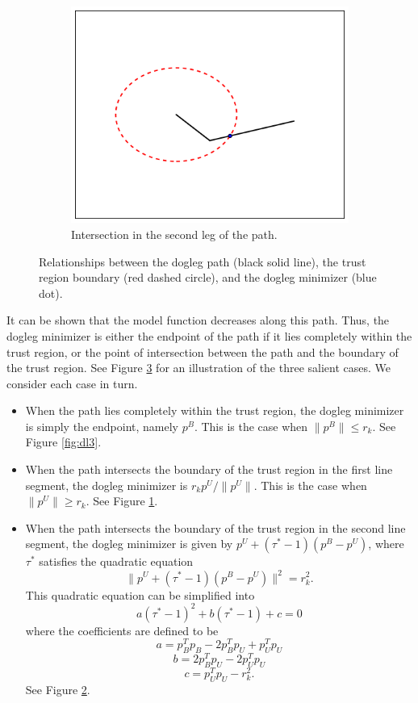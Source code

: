 \begin{figure}
\begin{subfigure}[b]{0.3\textwidth}
            \label{fig:dl1}
    \end{subfigure}
    ~ %
    \begin{subfigure}[b]{0.3\textwidth}
            \includegraphics[width=\textwidth]{dogleg2}
            \caption{Intersection in the second leg of the path.}
            \label{fig:dl2}
    \end{subfigure}
    \caption{Relationships between the dogleg path (black solid line),
    the trust region boundary (red dashed circle), and the dogleg minimizer (blue dot).}
    \label{fig:dogleg}
\end{figure}

It can be shown that the model function decreases along this path. Thus,
the dogleg minimizer is either the endpoint of the path if it lies completely within the trust region,
or the point of intersection between the path and the boundary of the trust region.
See Figure \ref{fig:dogleg} for an illustration of the three salient cases. We consider each case in turn.
\begin{itemize}
\item
When the path lies completely within the trust region, the dogleg minimizer is simply the endpoint, namely $p^B$.
This is the case when $\|p^B\| \leq r_k$. See Figure \ref{fig:dl3}.
\item
When the path intersects the boundary of the trust region in the first line segment, the dogleg minimizer is
$r_kp^U/\|p^U\|$.
This is the case when $\|p^U\| \geq r_k$. See Figure \ref{fig:dl1}.
\item
When the path intersects the boundary of the trust region in the second line segment, the dogleg minimizer is
given by $p^U + (\tau^*-1)(p^B-p^U)$, where $\tau^*$ satisfies the quadratic equation
\[
\|p^U + (\tau^*-1)(p^B-p^U)\|^2 = r_k^2.
\]
This quadratic equation can be simplified into 
\[
a(\tau^*-1)^2+b(\tau^*-1)+c = 0
\]
where the coefficients are defined to be
\[
a = p_B^Tp_B - 2p_B^Tp_U+p_U^Tp_U
\]
\[
b = 2p_B^Tp_U-2p_U^Tp_U
\]
\[
c = p_U^Tp_U-r_k^2.
\]
See Figure \ref{fig:dl2}.
\end{itemize}

